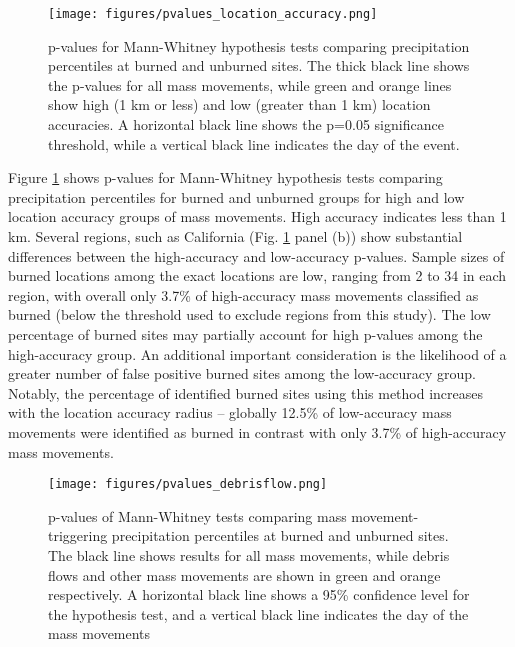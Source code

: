 \documentclass[nhess, manuscript]{copernicus}
\begin{document}
\begin{figure}
    \centering
    \texttt{[image: figures/pvalues\_location\_accuracy.png]}
    \caption{p-values for Mann-Whitney hypothesis tests comparing precipitation percentiles at burned and unburned sites. The thick black line shows the p-values for all mass movements, while green and orange lines show high (1 km or less) and low (greater than 1 km) location accuracies. A horizontal black line shows the p=0.05 significance threshold, while a vertical black line indicates the day of the event.}
    \label{fig:p-location}
\end{figure}

Figure \ref{fig:p-location} shows p-values for Mann-Whitney hypothesis tests comparing precipitation percentiles for burned and unburned groups for high and low location accuracy groups of mass movements. High accuracy indicates less than 1 km. Several regions, such as California (Fig. \ref{fig:p-location} panel (b)) show substantial differences between the high-accuracy and low-accuracy p-values. Sample sizes of burned locations among the exact locations are low, ranging from 2 to 34 in each region, with overall only 3.7\% of high-accuracy  mass movements classified as burned (below the threshold used to exclude regions from this study). The low percentage of burned sites may partially account for high p-values among the high-accuracy group. An additional important consideration is the likelihood of a greater number of false positive burned sites among the low-accuracy group. Notably, the percentage of identified burned sites using this method increases with the location accuracy radius – globally 12.5\% of low-accuracy  mass movements were identified as burned in contrast with only 3.7\% of high-accuracy  mass movements.

\begin{figure}
    \centering
    \texttt{[image: figures/pvalues\_debrisflow.png]}
    \caption{p-values of Mann-Whitney tests comparing  mass movement-triggering precipitation percentiles at burned and unburned sites. The black line shows results for all  mass movements, while debris flows and other  mass movements are shown in green and orange respectively. A horizontal black line shows a 95\% confidence level for the hypothesis test, and a vertical black line indicates the day of the  mass movements}
    \label{fig:p-debrisflow}
\end{figure}
\end{document}

